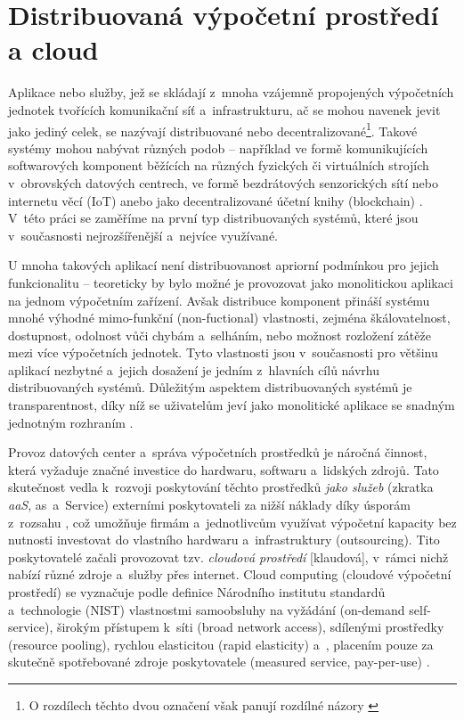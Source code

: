 \documentclass[czech, ing, kiv, he, iso690]{fasthesis}
\begin{document}

\chapter{Distribuovaná výpočetní prostředí a cloud}
Aplikace nebo služby, jež se skládají z~mnoha vzájemně propojených výpočetních jednotek tvořících komunikační síť a~infrastrukturu, ač se mohou navenek jevit jako jediný celek, se nazývají distribuované nebo decentralizované\footnote{O rozdílech těchto dvou označení však panují rozdílné názory \cite{distrib_sys_4}}. Takové systémy mohou nabývat různých podob -- například ve formě komunikujících softwarových komponent běžících na různých fyzických či virtuálních strojích v~obrovských datových centrech, ve formě bezdrátových senzorických sítí nebo internetu věcí (IoT) anebo jako decentralizované účetní knihy (blockchain) \cite{distrib_sys_4}. V~této práci se zaměříme na první typ distribuovaných systémů, které jsou v~současnosti nejrozšířenější a~nejvíce využívané.

U mnoha takových aplikací není distribuovanost apriorní podmínkou pro jejich funkcionalitu -- teoreticky by bylo možné je provozovat jako monolitickou aplikaci na jednom výpočetním zařízení. Avšak distribuce komponent přináší systému mnohé výhodné mimo-funkční (non-fuctional) vlastnosti, zejména škálovatelnost, dostupnost, odolnost vůči chybám a~selháním, nebo možnost rozložení zátěže mezi více výpočetních jednotek. Tyto vlastnosti jsou v~současnosti pro většinu aplikací nezbytné a~jejich dosažení je jedním z~hlavních cílů návrhu distribuovaných systémů. Důležitým aspektem distribuovaných systémů je transparentnost, díky níž se uživatelům jeví jako monolitické aplikace se snadným jednotným rozhraním \cite{distrib_sys_4}.

Provoz datových center a~správa výpočetních prostředků je náročná činnost, která vyžaduje značné investice do hardwaru, softwaru a~lidských zdrojů. Tato skutečnost vedla k~rozvoji poskytování těchto prostředků \emph{jako služeb} (zkratka \emph{aaS}, as~a~Service) externími poskytovateli za nižší náklady díky úsporám z~rozsahu \cite{cloud_theory_practice}, což umožňuje firmám a~jednotlivcům využívat výpočetní kapacity bez nutnosti investovat do vlastního hardwaru a~infrastruktury (outsourcing). Tito poskytovatelé začali provozovat tzv. \emph{cloudová prostředí} [klaudová], v~rámci nichž nabízí různé zdroje a~služby přes internet. Cloud computing (cloudové výpočetní prostředí) se vyznačuje podle definice Národního institutu standardů a~technologie (NIST) vlastnostmi samoobsluhy na vyžádání (on-demand self-service), širokým přístupem k~síti (broad network access), sdílenými prostředky (resource pooling), rychlou elasticitou (rapid elasticity) a~, placením pouze za skutečně spotřebované zdroje poskytovatele (measured service, pay-per-use) \cite{cloud_patterns, distrib_sys_4}. 
\end{document}
